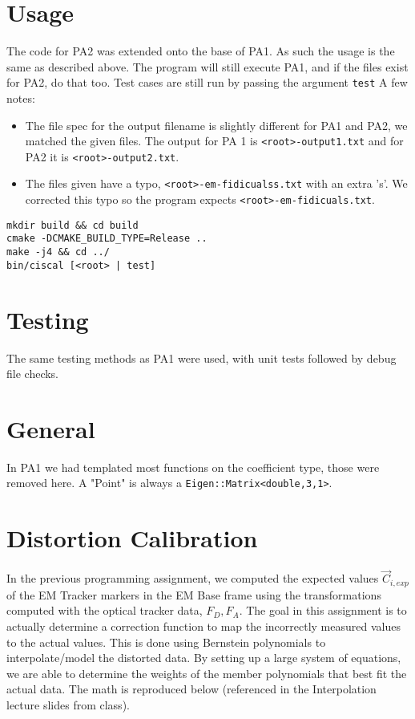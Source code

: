 \documentclass[letterpaper, 11pt]{report}
\begin{document}
\section{Usage}
The code for PA2 was extended onto the base of PA1. As such the usage is the same as described above. The program will still execute PA1, and if the files exist for PA2, do that too. Test cases are still run by passing the argument \texttt{test} A few notes:
\begin{itemize}
\item The file spec for the output filename is slightly different for PA1 and PA2, we matched the given files. The output for PA 1 is \texttt{<root>-output1.txt} and for PA2 it is \texttt{<root>-output2.txt}.
\item The files given have a typo, \texttt{<root>-em-fidicualss.txt} with an extra 's'. We corrected this typo so the program expects \texttt{<root>-em-fidicuals.txt}.
\end{itemize}
\begin{verbatim}
mkdir build && cd build
cmake -DCMAKE_BUILD_TYPE=Release ..
make -j4 && cd ../
bin/ciscal [<root> | test]
\end{verbatim}

\section{Testing}
The same testing methods as PA1 were used, with unit tests followed by debug file checks.
\section{General}
In PA1 we had templated most functions on the coefficient type, those were removed here. A "Point" is always a \texttt{Eigen::Matrix<double,3,1>}.
\section{Distortion Calibration}
In the previous programming assignment, we computed the expected values $\vec C_{i,exp}$ of the EM Tracker markers in the EM Base frame using the transformations computed with the optical tracker data, $F_D, F_A$. The goal in this assignment is to actually determine a correction function to map the incorrectly measured values to the actual values. This is done using Bernstein polynomials to interpolate/model the distorted data. By setting up a large system of equations, we are able to determine the weights of the member polynomials that best fit the actual data. The math is reproduced below (referenced in the Interpolation lecture slides from class).
\end{document}
